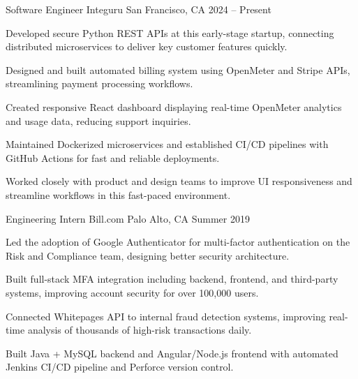 \documentclass[12pt, letterpaper]{russell}
\begin{document}
\vspace{-0.2cm}
\begin{cventries}

\cventry
  {Software Engineer} %
  {Integuru} %
  {San Francisco, CA} %
  {2024 -- Present} %
  {
\begin{cvitems}
  \item {Developed secure Python REST APIs at this early-stage startup, connecting distributed microservices to deliver key customer features quickly.}
  \item {Designed and built automated billing system using OpenMeter and Stripe APIs, streamlining payment processing workflows.}
  \item {Created responsive React dashboard displaying real-time OpenMeter analytics and usage data, reducing support inquiries.}
  \item {Maintained Dockerized microservices and established CI/CD pipelines with GitHub Actions for fast and reliable deployments.}
  \item {Worked closely with product and design teams to improve UI responsiveness and streamline workflows in this fast-paced environment.}
\end{cvitems}
}

\vspace{0.1cm}

  \cventry
    {Engineering Intern} %
    {Bill.com} %
    {Palo Alto, CA} %
    {Summer 2019} %
    {
\begin{cvitems}
  \item {Led the adoption of Google Authenticator for multi-factor authentication on the Risk and Compliance team, designing better security architecture.}
  \item {Built full-stack MFA integration including backend, frontend, and third-party systems, improving account security for over 100,000 users.}
  \item {Connected Whitepages API to internal fraud detection systems, improving real-time analysis of thousands of high-risk transactions daily.}
  \item {Built Java + MySQL backend and Angular/Node.js frontend with automated Jenkins CI/CD pipeline and Perforce version control.}
\end{cvitems}
    }


\end{cventries}
\end{document}
